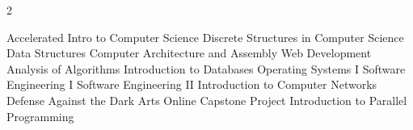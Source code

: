 \begin{multicols}{2}
\begin{itemize}
 Accelerated Intro to Computer Science
 Discrete Structures in Computer Science
 Data Structures
 Computer Architecture and Assembly
 Web Development
 Analysis of Algorithms
 Introduction to Databases
 Operating Systems I
 Software Engineering I
 Software Engineering II
 Introduction to Computer Networks
 Defense Against the Dark Arts
 Online Capstone Project
 Introduction to Parallel Programming
\end{itemize}
\end{multicols}

